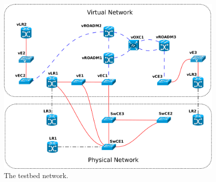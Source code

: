 \documentclass[10pt,a4paper]{report}
\begin{document}
\begin{figure}[!htbp]
  \begin{center}
    \includegraphics[width=1\textwidth]{img/testbed_model}
    \caption[Testbed model]{The testbed network.}
    \label{fig:testbed_model}
  \end{center}
\end{figure}
 
\end{document}
